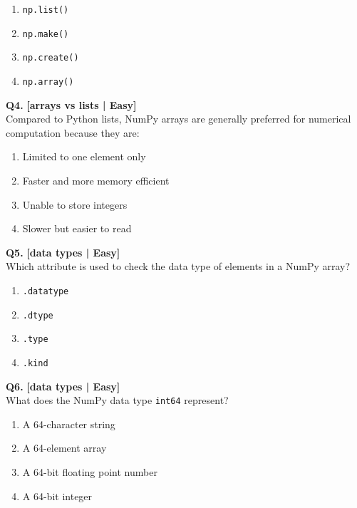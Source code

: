 \begin{enumerate}[label=(\alph*),topsep=2pt,itemsep=1pt,partopsep=0pt,parsep=0pt]
    \item \relax \texttt{np.list()}
    \item \relax \texttt{np.make()}
    \item \relax \texttt{np.create()}
    \item \relax \texttt{np.array()}
\end{enumerate}
\vspace{2mm}

\noindent\textbf{Q4.} \hfill {\small\color{LPUOrange}\textbf{[arrays vs lists | Easy]}}\\[2pt]
Compared to Python lists, NumPy arrays are generally preferred for numerical computation because they are:

\begin{enumerate}[label=(\alph*),topsep=2pt,itemsep=1pt,partopsep=0pt,parsep=0pt]
    \item \relax Limited to one element only
    \item \relax Faster and more memory efficient
    \item \relax Unable to store integers
    \item \relax Slower but easier to read
\end{enumerate}
\vspace{2mm}

\noindent\textbf{Q5.} \hfill {\small\color{LPUOrange}\textbf{[data types | Easy]}}\\[2pt]
Which attribute is used to check the data type of elements in a NumPy array?

\begin{enumerate}[label=(\alph*),topsep=2pt,itemsep=1pt,partopsep=0pt,parsep=0pt]
    \item \relax \texttt{.datatype}
    \item \relax \texttt{.dtype}
    \item \relax \texttt{.type}
    \item \relax \texttt{.kind}
\end{enumerate}
\vspace{2mm}

\noindent\textbf{Q6.} \hfill {\small\color{LPUOrange}\textbf{[data types | Easy]}}\\[2pt]
What does the NumPy data type \texttt{int64} represent?

\begin{enumerate}[label=(\alph*),topsep=2pt,itemsep=1pt,partopsep=0pt,parsep=0pt]
    \item \relax A 64-character string
    \item \relax A 64-element array
    \item \relax A 64-bit floating point number
    \item \relax A 64-bit integer
\end{enumerate}
\vspace{2mm}

